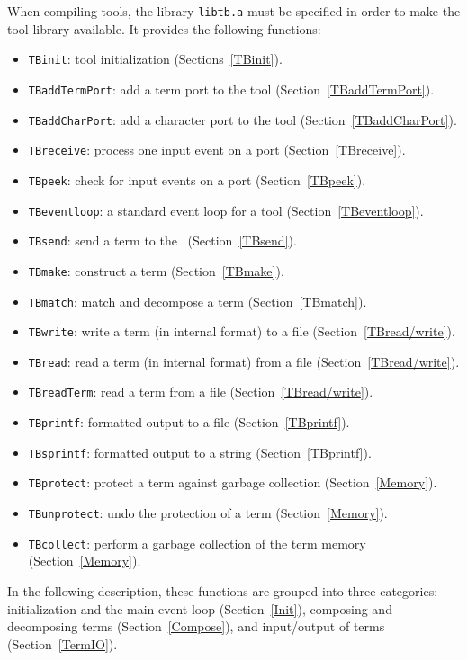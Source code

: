 When compiling tools, the library {\tt libtb.a} must be specified
in order to make the tool library available. It provides the following functions:

\begin{itemize}
\item {\tt TBinit}: tool initialization (Sections~\ref{TBinit}).
\item {\tt TBaddTermPort}: add a term port to the tool (Section~\ref{TBaddTermPort}).
\item {\tt TBaddCharPort}: add a character port to the tool (Section~\ref{TBaddCharPort}).
\item {\tt TBreceive}: process one input event on a port (Section~\ref{TBreceive}).
\item {\tt TBpeek}: check for input events on a port (Section~\ref{TBpeek}).
\item {\tt TBeventloop}: a standard event loop for a tool (Section~\ref{TBeventloop}).
\item {\tt TBsend}: send a term to the \TB\ (Section~\ref{TBsend}).
\item {\tt TBmake}: construct a term (Section~\ref{TBmake}).
\item {\tt TBmatch}: match and decompose a term (Section~\ref{TBmatch}).
\item {\tt TBwrite}: write a term (in internal format) to a file (Section~\ref{TBread/write}).
\item {\tt TBread}: read a term (in internal format) from a file (Section~\ref{TBread/write}).
\item {\tt TBreadTerm}: read a term from a file (Section~\ref{TBread/write}).
\item {\tt TBprintf}: formatted output to a file (Section~\ref{TBprintf}).
\item {\tt TBsprintf}: formatted output to a string (Section~\ref{TBprintf}).
\item {\tt TBprotect}: protect a term against garbage collection (Section~\ref{Memory}).
\item {\tt TBunprotect}: undo the protection of a term (Section~\ref{Memory}).
\item {\tt TBcollect}: perform a garbage collection of the term memory (Section~\ref{Memory}).


\end{itemize}

In the following description, these functions are grouped into three categories:
initialization and the main event loop (Section~\ref{Init}),
composing and decomposing terms (Section~\ref{Compose}),
and input/output of terms (Section~\ref{TermIO}).


